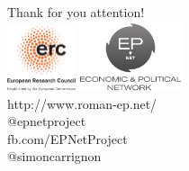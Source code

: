 \documentclass[12pt, notes=show]{beamer}
\begin{document}
%	
%
	\begin{frame}{}
		\begin{center}
			\huge
			Thank for you attention!\\\vfill
			\includegraphics[width=2cm]{images/LOGO-ERC.jpg} \hfil	\includegraphics[width=3cm]{images/epnetLogo.png}\\
			\vspace{1cm}
			\scriptsize
			http://www.roman-ep.net/\\
			@epnetproject\\
			fb.com/EPNetProject\\
			@simoncarrignon
		\end{center}


	\end{frame}

	
\end{document}
